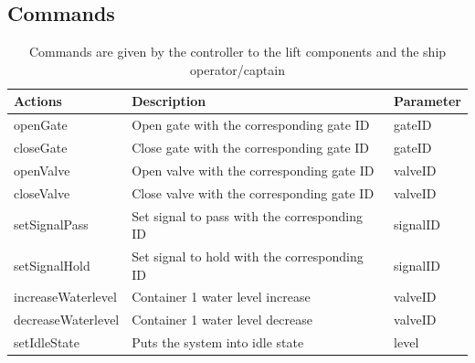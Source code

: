 \subsection{Commands}
\begin{table}[htbp]
	\centering
	\caption{Commands are given by the controller to the lift components and the ship operator/captain}
	\begin{tabular}{lll}
		\toprule
		\textbf{Actions} & \textbf{Description} & \textbf{Parameter} \\
		\midrule
		openGate & Open gate with the corresponding gate ID & gateID \\
		closeGate & Close gate with the corresponding gate ID & gateID \\
		openValve & Open valve with the corresponding gate ID & valveID \\
		closeValve & Close valve with the corresponding gate ID & valveID \\
		setSignalPass & Set signal to pass with the corresponding ID  & signalID \\
		setSignalHold & Set signal to hold with the corresponding ID  & signalID \\
		increaseWaterlevel & Container 1 water level increase & valveID \\
		decreaseWaterlevel & Container 1 water level decrease & valveID \\
		setIdleState & Puts the system into idle state & level \\ %
		\bottomrule
		\end{tabular}%
		\label{tab:addlabel}%
		\end{table}%
		
